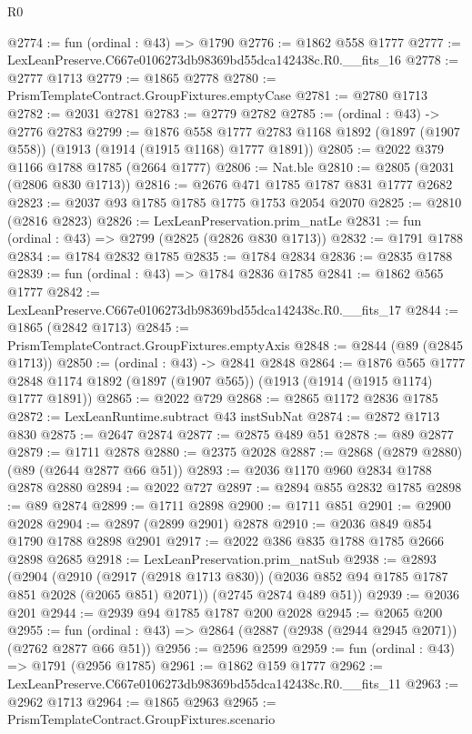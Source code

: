 \begin{lexlean}{R0}
\begin{coremodule}
@2774 := fun (ordinal : @43) => @1790
@2776 := @1862 @558 @1777
@2777 := LexLeanPreserve.C667e0106273db98369bd55dca142438c.R0.__fits_16
@2778 := @2777 @1713
@2779 := @1865 @2778
@2780 := PrismTemplateContract.GroupFixtures.emptyCase
@2781 := @2780 @1713
@2782 := @2031 @2781
@2783 := @2779 @2782
@2785 := (ordinal : @43) -> @2776 @2783
@2799 := @1876
    @558
    @1777
    @2783
    @1168
    @1892
    (@1897 (@1907 @558))
    (@1913 (@1914 (@1915 @1168) @1777 @1891))
@2805 := @2022 @379 @1166 @1788 @1785 (@2664 @1777)
@2806 := Nat.ble
@2810 := @2805 (@2031 (@2806 @830 @1713))
@2816 := @2676 @471 @1785 @1787 @831 @1777 @2682
@2823 := @2037 @93 @1785 @1785 @1775 @1753 @2054 @2070
@2825 := @2810 (@2816 @2823)
@2826 := LexLeanPreservation.prim_natLe
@2831 := fun (ordinal : @43) => @2799 (@2825 (@2826 @830 @1713))
@2832 := @1791 @1788
@2834 := @1784 @2832 @1785
@2835 := @1784 @2834
@2836 := @2835 @1788
@2839 := fun (ordinal : @43) => @1784 @2836 @1785
@2841 := @1862 @565 @1777
@2842 := LexLeanPreserve.C667e0106273db98369bd55dca142438c.R0.__fits_17
@2844 := @1865 (@2842 @1713)
@2845 := PrismTemplateContract.GroupFixtures.emptyAxis
@2848 := @2844 (@89 (@2845 @1713))
@2850 := (ordinal : @43) -> @2841 @2848
@2864 := @1876
    @565
    @1777
    @2848
    @1174
    @1892
    (@1897 (@1907 @565))
    (@1913 (@1914 (@1915 @1174) @1777 @1891))
@2865 := @2022 @729
@2868 := @2865 @1172 @2836 @1785
@2872 := LexLeanRuntime.subtract @43 instSubNat
@2874 := @2872 @1713 @830
@2875 := @2647 @2874
@2877 := @2875 @489 @51
@2878 := @89 @2877
@2879 := @1711 @2878
@2880 := @2375 @2028
@2887 := @2868 (@2879 @2880) (@89 (@2644 @2877 @66 @51))
@2893 := @2036 @1170 @960 @2834 @1788 @2878 @2880
@2894 := @2022 @727
@2897 := @2894 @855 @2832 @1785
@2898 := @89 @2874
@2899 := @1711 @2898
@2900 := @1711 @851
@2901 := @2900 @2028
@2904 := @2897 (@2899 @2901) @2878
@2910 := @2036 @849 @854 @1790 @1788 @2898 @2901
@2917 := @2022 @386 @835 @1788 @1785 @2666 @2898 @2685
@2918 := LexLeanPreservation.prim_natSub
@2938 := @2893
    (@2904
      (@2910 (@2917 (@2918 @1713 @830)) (@2036 @852 @94 @1785 @1787 @851 @2028 (@2065 @851) @2071))
      (@2745 @2874 @489 @51))
@2939 := @2036 @201
@2944 := @2939 @94 @1785 @1787 @200 @2028
@2945 := @2065 @200
@2955 := fun (ordinal : @43) => @2864 (@2887 (@2938 (@2944 @2945 @2071)) (@2762 @2877 @66 @51))
@2956 := @2596 @2599
@2959 := fun (ordinal : @43) => @1791 (@2956 @1785)
@2961 := @1862 @159 @1777
@2962 := LexLeanPreserve.C667e0106273db98369bd55dca142438c.R0.__fits_11
@2963 := @2962 @1713
@2964 := @1865 @2963
@2965 := PrismTemplateContract.GroupFixtures.scenario

\end{coremodule}
\end{lexlean}

